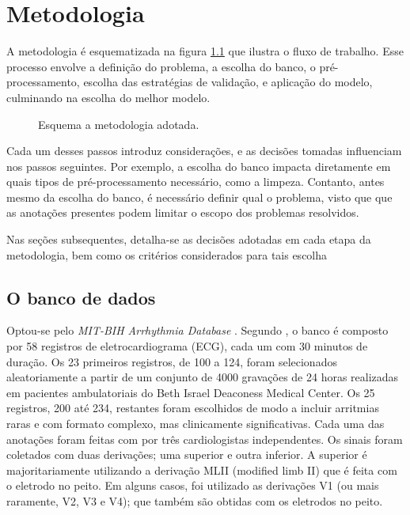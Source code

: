 \chapter{Metodologia}

A metodologia é esquematizada na figura \ref{fig:metodologia} que ilustra o fluxo de trabalho. Esse processo envolve a definição do problema,
a escolha do banco, o pré-processamento, escolha das estratégias de validação, e aplicação do modelo, culminando na escolha do melhor modelo.

\begin{figure}[H]
  \centering
  \caption{Esquema a metodologia adotada.}
  \label{fig:metodologia}
\end{figure}

Cada um desses passos introduz considerações, e as decisões tomadas influenciam nos passos seguintes. Por exemplo, a escolha do banco impacta diretamente em 
quais tipos de pré-processamento necessário, como a limpeza. Contanto, antes mesmo da escolha do banco, é necessário definir qual o problema, visto que 
que as anotações presentes podem limitar o escopo dos problemas resolvidos. 

Nas seções subsequentes, detalha-se as decisões adotadas em cada etapa da metodologia, bem como os critérios considerados para tais escolha


\section{O banco de dados}
\label{sec:particionamento}

Optou-se pelo \textit{MIT-BIH Arrhythmia Database} \cite{mitbih2005}. Segundo , o banco é composto por 58 registros de eletrocardiograma (ECG), cada um com 30 minutos de duração. 
Os 23 primeiros registros, de 100 a 124, foram selecionados aleatoriamente a partir de um conjunto de 4000 gravações de 24 horas realizadas em pacientes ambulatoriais do Beth Israel Deaconess Medical Center. 
Os 25 registros, 200 até 234, restantes foram escolhidos de modo a incluir arritmias raras e com formato complexo, mas clinicamente significativas.
Cada uma das anotações foram feitas com por três cardiologistas independentes. Os sinais foram coletados com duas derivações; uma superior e outra inferior. A superior
é majoritariamente utilizando a derivação MLII (modified limb II) que é feita com o eletrodo no peito. 
Em alguns casos, foi utilizado as derivações V1 (ou mais raramente, V2, V3 e V4); que também são obtidas com os eletrodos no peito.


